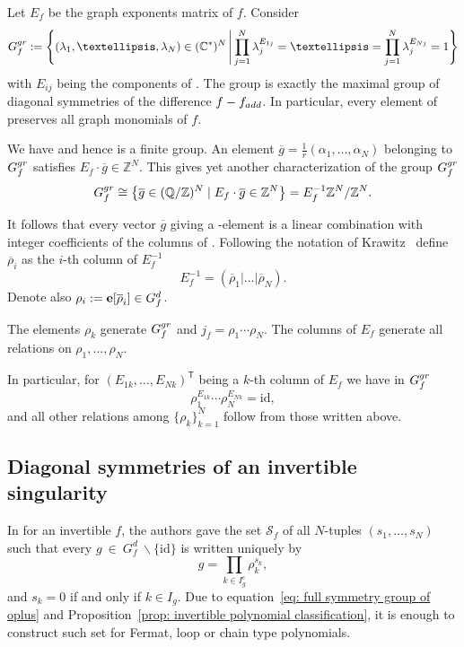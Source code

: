 \documentclass[10pt,a4paper]{article}
\numberwithin{equation}{section}
\newcommand{\CC}{{\mathbb{C}}}
\newcommand{\QQ}{{\mathbb{Q}}}
\newcommand{\ZZ}{{\mathbb{Z}}}
\newcommand{\calS}{{\mathcal S}}
\newcommand{\epi}{{\bf e}}
\newcommand{\id}{\mathrm{id}}
\begin{document}
Let $E_f$ be the graph exponents matrix of $f$. Consider
\begin{equation*}
G_f^{\rm gr} := \Biggl\{(\lambda_1,\dots,\lambda_N)\in (\CC^*)^N \, \Biggl|\, \prod_{j=1}^N \lambda_j ^{E_{1j}}=\dots =\prod_{j=1}^N\lambda_j^{E_{Nj}}=1 \Biggr\} \end{equation*}
with $E_{ij}$ being the components of .
The group  is exactly the maximal group of diagonal symmetries of the difference $f-f_{\rm add}$. In particular, every element of  preserves all graph monomials of $f$.

We have  and hence  is a finite group.
An element ${\overline g = \frac{1}{r}(\alpha_1,\dots,\alpha_N)}$ belonging to $G_f^{\rm gr}$ satisfies
$E_f \cdot \overline g \in \ZZ^N$.
This gives yet another characterization of the group $G_f^{\rm gr}$
\begin{equation*}%
	G_f^{\rm gr} \cong \bigl\lbrace \overline g \in (\QQ/\ZZ)^N \mid E_f \cdot \overline g \in \ZZ^N \bigr\rbrace = E_f^{-1} \ZZ^N / \ZZ^N.
\end{equation*}

It follows that every vector $\overline g$ giving a -element is a linear combination with integer coefficients of the columns of . Following the notation of Krawitz~\cite{K09} define $\overline \rho_i$ as the $i$-th column of $E_f^{-1}$
\begin{equation*}
	E_f^{-1} =  ( \overline \rho_1 | \dots | \overline \rho_N  ).
\end{equation*}
Denote also $\rho_i := \epi[\overline \rho_i] \in G_f^d$.

The elements $\rho_k$ generate $G_f^{\rm gr}$ and $j_f = \rho_1\cdots\rho_N$.
The columns of $E_f$ generate all relations on $\rho_1, \dots, \rho_N$.

In particular, for $(E_{1k}, \dots, E_{Nk})^{\mathsf{T}}$ being a $k$-th column of $E_f$ we have in $G_f^{\rm gr}$
\[
\rho_1^{E_{1k}}\cdots \rho_N^{E_{Nk}} = \id,
\]
and all other relations among $\lbrace \rho_k \rbrace_{k=1}^N$ follow from those written above.

\subsection{Diagonal symmetries of an invertible singularity}

In \cite{FJJS} for an invertible $f$, the authors gave the set $\calS_f$ of all $N$-tuples $(s_1,\dots,s_N)$ such that every $g~\in~G_f^d~\backslash\lbrace\id\rbrace$ is written uniquely by
\[
	g = \prod_{k \in I_g^c} \rho_k^{s_k},
\]
and $s_k = 0$ if and only if $k \in I_g$. Due to equation~\eqref{eq: full symmetry group of oplus} and Proposition~\ref{prop: invertible polynomial classification}, it is enough to construct such set for Fermat, loop or chain type polynomials.
\end{document}
